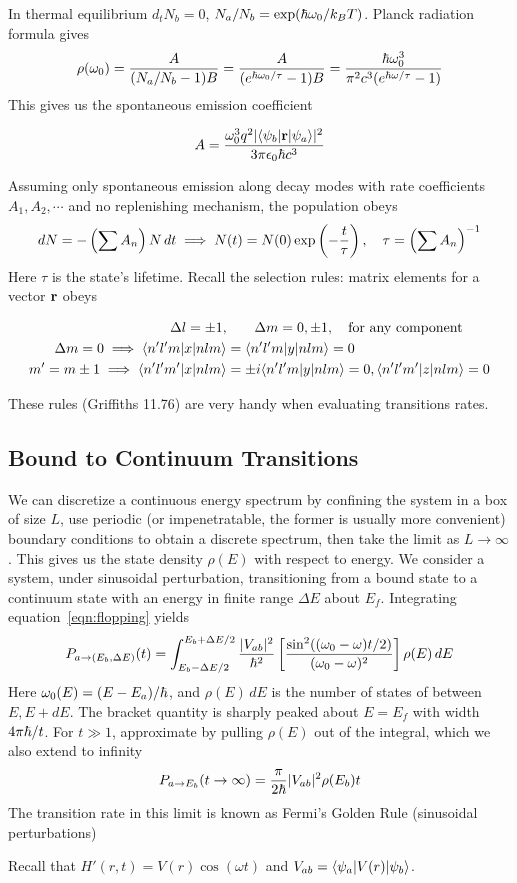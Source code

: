 In thermal equilibrium $d_tN_b=0$, $N_a/N_b = \exp(\hbar \omega_0 / k_B T)$. 
Planck radiation formula gives 
\[ 
    \rho(\omega_0) = \dfrac A {(N_a/N_b - 1)B} = \dfrac A {(e^{\hbar \omega_0 / \tau} - 1)B} 
        = \dfrac{\hbar \omega_0^3}{\pi^2c^3(e^{\hbar\omega / \tau} - 1)}
\] 
This gives us the spontaneous emission coefficient 
\begin{mdframed}
\[ 
    A = \dfrac{\omega_0^3q^2|\langle \psi_b|\mathbf r|\psi_a\rangle|^2}{3\pi \epsilon_0 \hbar c^3}
\] 
\end{mdframed}
Assuming only spontaneous emission along decay modes with rate coefficients
$A_1, A_2, \cdots$ and no replenishing mechanism, the population obeys 
\[ 
    dN = -\left(\sum A_n\right) N\, dt \implies N(t) = N(0)\exp\left(-\dfrac t \tau\right),
    \quad \tau = \left(\sum A_n\right)^{-1}
\] 
Here $\tau$ is the state's lifetime.
Recall the selection rules: matrix elements for a vector $\mathbf r$ obeys 
\begin{mdframed}
\[\begin{aligned}
    \Delta l = \pm 1,&\quad\quad \Delta m = 0, \pm 1, \quad \text{for any component} \\ 
    \Delta m = 0 \implies \langle n'l'm|x|nlm\rangle &= \langle n'l'm|y|nlm\rangle = 0 \\ 
    m' = m\pm 1 \implies \langle n'l'm'|x|nlm\rangle &= \pm i \langle n'l'm|y|nlm\rangle = 0, 
    \langle n'l'm'|z|nlm\rangle = 0
\end{aligned}\]
\end{mdframed}
These rules (Griffiths 11.76) are very handy when evaluating transitions rates. 

\subsection{Bound to Continuum Transitions}
We can discretize a continuous energy spectrum by confining the system in a box of size 
$L$, use periodic (or impenetratable, the former is usually more convenient) boundary conditions 
to obtain a discrete spectrum, then take the limit as $L\to \infty$. This gives us the 
state density $\rho(E)$ with respect to energy. 
We consider a system, under sinusoidal perturbation, 
transitioning from a bound state to a continuum state 
with an energy in finite range $\Delta E$ about $E_f$. 
Integrating equation~\ref{eqn:flopping} yields 
\[ 
    P_{a\to (E_b, \Delta E)}(t) = 
    \int_{E_b - \Delta E / 2}^{E_b + \Delta E/2} \dfrac{|V_{ab}|^2}{\hbar^2} 
    \left[\dfrac{\sin^2((\omega_0 - \omega) t/2)}{(\omega_0 - \omega)^2}\right]\rho(E)\, dE 
\] 
Here $\omega_0(E) = (E - E_a)/\hbar$, and $\rho(E)\, dE$ is the number of states of between $E, E+dE$. 
The bracket quantity is sharply peaked about $E=E_f$ with width $4\pi \hbar/t$. For $t\gg 1$, 
approximate by pulling $\rho(E)$ out of the integral, which we also extend to infinity 
\[ 
    P_{a\to E_b}(t\to \infty) = \dfrac \pi {2\hbar} |V_{ab}|^2 \rho(E_b)t 
\] 
The transition rate in this limit is known as Fermi's Golden Rule (sinusoidal perturbations)
\begin{mdframed}\end{mdframed}
Recall that $H'(r, t)=V(r)\cos(\omega t)$ and $V_{ab}=\langle \psi_a|V(r)|\psi_b\rangle$. 

